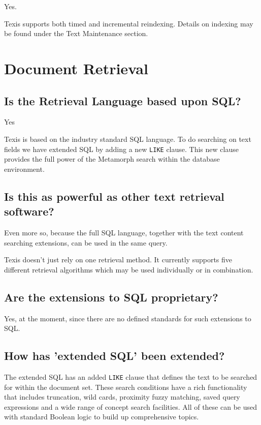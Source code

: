 Yes.

Texis supports both timed and incremental reindexing. Details on
indexing may be found under the Text Maintenance section.

\section{Document Retrieval}

\subsection{Is the Retrieval Language based upon SQL?}

Yes

Texis is based on the industry standard SQL language.  To do searching on
text fields we have extended SQL by adding a new \verb`LIKE` clause.  This new
clause provides the full power of the Metamorph search within the
database environment.

\subsection{Is this as powerful as other text retrieval software?}

Even more so, because the full SQL language, together with the text
content searching extensions, can be used in the same query.

Texis doesn't just rely on one retrieval method. It currently supports
five different retrieval algorithms which may be used individually
or in combination.

\subsection{Are the extensions to SQL proprietary?}

Yes, at the moment, since there are no defined standards for such
extensions to SQL.

\subsection{How has 'extended SQL' been extended?}

The extended SQL has an added \verb`LIKE` clause that defines the text to be
searched for within the document set.  These search conditions have a rich
functionality that includes truncation, wild cards, proximity fuzzy
matching, saved query expressions and a wide range of concept search
facilities.  All of these can be used with standard Boolean logic to build
up comprehensive topics.

